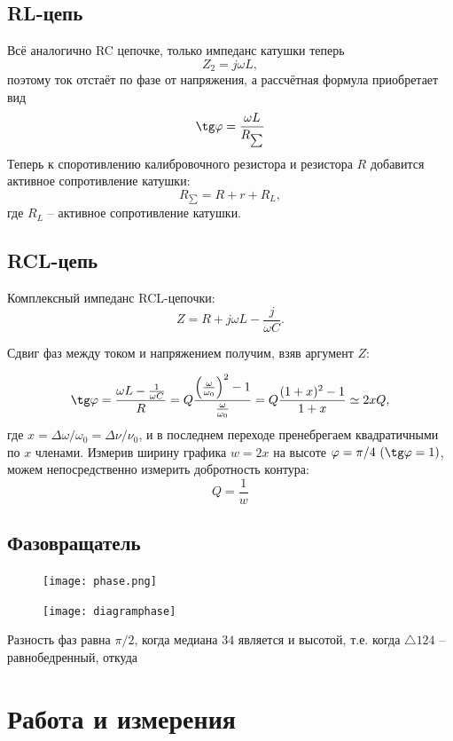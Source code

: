 \documentclass[a4paper, 12pt]{article}
\begin{document}
\subsection*{RL-цепь}

Всё аналогично RC цепочке, только импеданс катушки теперь 
$$Z_2 = j\omega L,$$
поэтому ток отстаёт по фазе от напряжения, а рассчётная формула приобретает вид
$$\tg \varphi = \frac{\omega L}{R_{\sum}}$$
Теперь к споротивлению калибровочного резистора и резистора $R$ добавится активное сопротивление катушки:
$$R_{\sum} = R+r+R_L,$$
где $R_L$ -- активное сопротивление катушки.

\subsection*{RCL-цепь}

Комплексный импеданс RCL-цепочки:
$$Z=R+j\omega L - \frac{j}{\omega C}.$$

Сдвиг фаз между током и напряжением получим, взяв аргумент $Z$:

$$\tg\varphi = \frac{\omega L - \frac{1}{\omega C}}{R} = Q\frac{\left(\frac{\omega}{\omega_0}\right)^2 - 1}{\frac{\omega}{\omega_0}} = Q\frac{(1+x)^2-1}{1+x} \simeq 2x Q,$$
где $x = \Delta \omega / \omega_0 = \Delta \nu / \nu_0$, и в последнем переходе пренебрегаем квадратичными по $x$ членами.
Измерив ширину графика $w=2x$ на высоте $\varphi = \pi / 4\ (\tg\varphi = 1)$, можем непосредственно измерить добротность контура:
$$Q = \frac{1}{w}$$

\subsection*{Фазовращатель}

\begin {figure}[H]
\begin{center}
\texttt{[image: phase.png]}
\end{center}
\end {figure}


\begin {figure}[H]
\begin{center}
\texttt{[image: diagramphase]}
\end{center}
\end {figure}

Разность фаз равна $\pi /2$, когда медиана $34$ является и высотой, т.е. когда $\triangle 124$ -- равнобедренный, откуда

\section{Работа и измерения}
\end{document}
